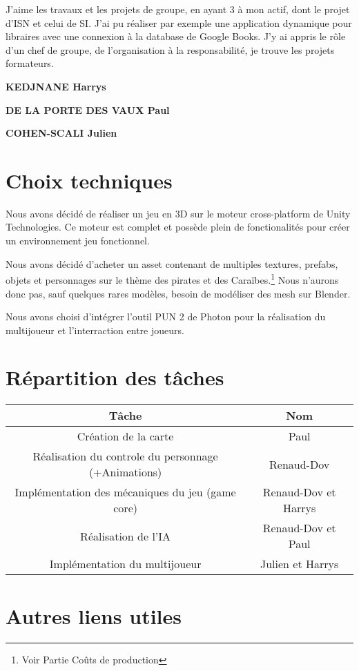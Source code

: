 \documentclass[french, 12pt, a4paper,twoside]{article}
\begin{document}
J'aime les travaux et les projets de groupe, en ayant 3 à mon actif, dont le projet d'ISN et celui de SI. J'ai pu réaliser par exemple une application dynamique pour libraires avec une connexion à la database de Google Books.
J'y ai appris le rôle d'un chef de groupe, de l'organisation à la responsabilité, je trouve les projets formateurs.



\textbf{KEDJNANE Harrys} \newline


\textbf{DE LA PORTE DES VAUX Paul} \newline

\textbf{COHEN-SCALI Julien} \newline

\section{Choix techniques}

Nous avons décidé de réaliser un jeu en 3D sur le moteur cross-platform de Unity Technologies.
Ce moteur est complet et possède plein de fonctionalités pour créer un environnement jeu fonctionnel.

Nous avons décidé d'acheter un asset contenant de multiples textures, prefabs, objets et personnages sur le thème des pirates et des Caraïbes.\footnote{Voir Partie Coûts de production}
Nous n'aurons donc pas, sauf quelques rares modèles, besoin de modéliser des mesh sur Blender.

Nous avons choisi d'intégrer l'outil PUN 2 de Photon pour la réalisation du multijoueur et l'interraction entre joueurs.


\section{Répartition des tâches}
\begin{center}
    \begin{tabular}{|c||c|}
        \hline
        \textbf{Tâche} & \textbf{Nom} \tabularnewline
        \hline
        Création de la carte & Paul\tabularnewline
        \hline
        Réalisation du controle du personnage (+Animations) & Renaud-Dov\tabularnewline
        \hline
        Implémentation des mécaniques du jeu (game core) & Renaud-Dov et Harrys\tabularnewline
        \hline
        Réalisation de l'IA & Renaud-Dov et Paul \tabularnewline
        \hline
        Implémentation du multijoueur & Julien et Harrys \tabularnewline
        \hline
    \end{tabular}
\end{center}




% 
\section{Autres liens utiles}
\end{document}
